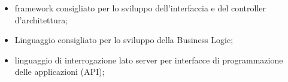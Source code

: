 \begin{itemize}
\item {} framework consigliato per lo sviluppo
dell'interfaccia e del controller d’architettura;
\item {} Linguaggio consigliato per lo sviluppo della Business Logic;
\item {} linguaggio di interrogazione lato server per interfacce di programmazione delle applicazioni (API);
\end{itemize}